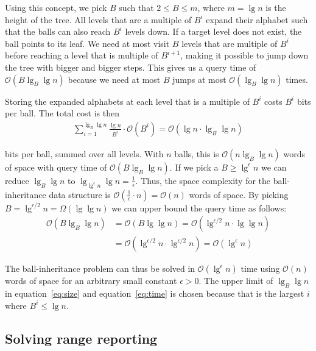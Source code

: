 Using this concept, we pick $B$ such that $2 \leq B \leq m$, where $m = \lg n$ is the height of the tree. All levels that are a multiple of $B^i$ expand their alphabet such that the balls can also reach $B^i$ levels down. If a target level does not exist, the ball points to its leaf. We need at most visit $B$ levels that are multiple of $B^i$ before reaching a level that is multiple of $B^{i+1}$, making it possible to jump down the tree with bigger and bigger steps. This gives us a query time of $\mathcal{O}(B \lg_B \lg n)$ because we need at most $B$ jumps at most $\mathcal{O}(\lg_B \lg n)$ times. 

Storing the expanded alphabets at each level that is a multiple of $B^i$ costs $B^i$ bits per ball. The total cost is then 
\begin{align}
  \sum\limits_{i=1}^{\lg_B \lg n} \frac{\lg n}{B^i} \cdot \mathcal{O}(B^i) = \mathcal{O}(\lg n \cdot \lg_B \lg n)
  \label{eq:size}
\end{align}


\noindent bits per ball, summed over all levels. With $n$ balls, this is $\mathcal{O}(n \lg_B \lg n)$ words of space with query time of $\mathcal{O}(B \lg_B \lg n)$. If we pick a $B \geq \lg^\epsilon n$ we can reduce $\lg_B \lg n$ to $\lg_{\lg^\epsilon n} \lg n = \frac{1}{\epsilon}$. Thus, the space complexity for the ball-inheritance data structure is $\mathcal{O}(\frac{1}{\epsilon} \cdot n) = \mathcal{O}(n)$ words of space. By picking $B = \lg^{\epsilon / 2} n = \Omega(\lg \lg n)$ we can upper bound the query time as follows:
\begin{align}
  \label{eq:time}
  \mathcal{O}(B \lg_B \lg n) &= \mathcal{O}(B \lg \lg n) = \mathcal{O}(\lg^{\epsilon /2} n \cdot \lg \lg n)\\
  &= \mathcal{O}(\lg^{\epsilon / 2} n \cdot \lg^{\epsilon / 2} n) = \mathcal{O}(\lg^\epsilon n) \nonumber
\end{align}

\noindent The ball-inheritance problem can thus be solved in $\mathcal{O}(\lg^\epsilon n)$ time using $\mathcal{O}(n)$ words of space for an arbitrary small constant $\epsilon > 0$. The upper limit of $\lg_B \lg n$ in equation~\ref{eq:size} and equation~\ref{eq:time} is chosen because that is the largest $i$ where $B^i \leq \lg n$.

\subsection{Solving range reporting}

